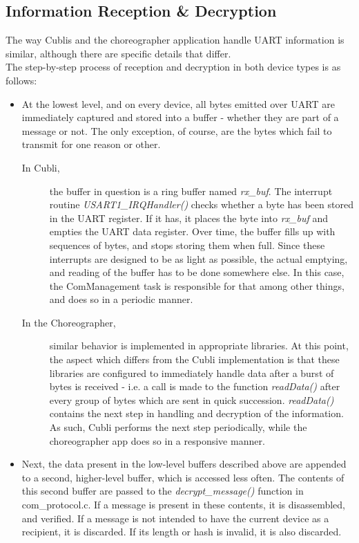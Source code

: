\subsection{Information Reception \& Decryption}

The way Cublis and the choreographer application handle UART information is similar, although there are specific details that differ.\\

The step-by-step process of reception and decryption in both device types is as follows:\\

\begin{itemize}
\item At the lowest level, and on every device, all bytes emitted over UART are immediately captured and stored into a buffer - whether they are part of a message or not. The only exception, of course, are the bytes which fail to transmit for one reason or other.

\begin{description}
\item[In Cubli,] the buffer in question is a ring buffer named \textit{rx\_buf}. The interrupt routine \textit{USART1\_IRQHandler()} checks whether a byte has been stored in the UART register. If it has, it places the byte into \textit{rx\_buf} and empties the UART data register. Over time, the buffer fills up with sequences of bytes, and stops storing them when full. Since these interrupts are designed to be as light as possible, the actual emptying, and reading of the buffer has to be done somewhere else. In this case, the ComManagement task is responsible for that among other things, and does so in a periodic manner.
\item[In the Choreographer,] similar behavior is implemented in appropriate libraries. At this point, the aspect which differs from the Cubli implementation is that these libraries are configured to immediately handle data after a burst of bytes is received - i.e. a call is made to the function \textit{readData()} after every group of bytes which are sent in quick succession. \textit{readData()} contains the next step in handling and decryption of the information.
As such, Cubli performs the next step periodically, while the choreographer app does so in a responsive manner.
\end{description}

\item Next, the data present in the low-level buffers described above are appended to a second, higher-level buffer, which is accessed less often. The contents of this second buffer are passed to the \textit{decrypt\_message()} function in com\_protocol.c. If a message is present in these contents, it is disassembled, and verified. If a message is not intended to have the current device as a recipient, it is discarded. If its length or hash is invalid, it is also discarded.


\end{itemize}
